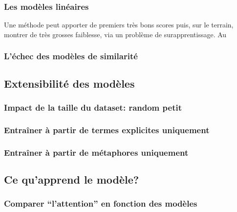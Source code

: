 \subsubsection{Les modèles linéaires}






Une méthode peut apporter de premiers très bons scores puis, sur le terrain, montrer de très grosses faiblesse, via un problème de surapprentissage. Au

\subsubsection{L’échec des modèles de similarité}


\subsection{Extensibilité des modèles}

\subsubsection{Impact de la taille du dataset: random petit}

\subsubsection{Entraîner à partir de termes explicites uniquement}


\subsubsection{Entraîner à partir de métaphores uniquement}

\subsection{Ce qu’apprend le modèle?}

\subsubsection{Comparer “l’attention” en fonction des modèles}

